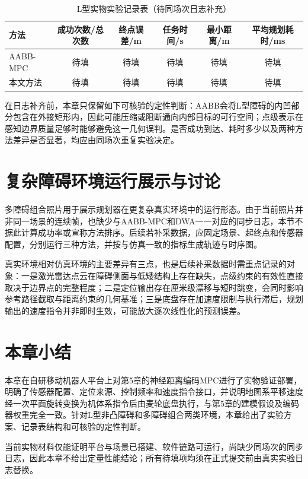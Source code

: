 \begin{table}[!htb]
	\centering
	\caption{L型实物实验记录表（待同场次日志补充）}
	\label{tab:实物L型结果}
	\scriptsize
	\begin{tabular}{lccccc}
		\toprule
		方法 & 成功次数/总次数 & 终点误差/m & 任务时间/s & 最小距离/m & 平均规划耗时/ms \\
		\midrule
		AABB-MPC & 待填 & 待填 & 待填 & 待填 & 待填 \\
		本文方法 & 待填 & 待填 & 待填 & 待填 & 待填 \\
		\bottomrule
	\end{tabular}
\end{table}

在日志补齐前，本章只保留如下可核验的定性判断：AABB会将L型障碍的内凹部分包含在外接矩形内，因此可能压缩或阻断通向内部目标的可行空间；点级表示在感知边界质量足够时能够避免这一几何误判。是否成功到达、耗时多少以及两种方法差异是否显著，均应由同场次重复实验决定。

\section{复杂障碍环境运行展示与讨论}
多障碍组合照片用于展示规划器在更复杂真实环境中的运行形态。由于当前照片并非同一场景的连续帧，也缺少与AABB-MPC和DWA一一对应的同步日志，本节不据此计算成功率或宣称方法排序。后续若补采数据，应固定场景、起终点和传感器配置，分别运行三种方法，并按与仿真一致的指标生成轨迹与时序图。

真实环境相对仿真环境的主要差异有三点，也是后续补采数据时需重点记录的对象：一是激光雷达点云在障碍侧面与低矮结构上存在缺失，点级约束的有效性直接取决于边界点的完整程度；二是定位输出存在厘米级漂移与短时跳变，会同时影响参考路径截取与距离约束的几何基准；三是底盘存在加速度限制与执行滞后，规划输出的速度指令并非即时生效，可能放大逐次线性化的预测误差。

\section{本章小结}
本章在自研移动机器人平台上对第5章的神经距离编码MPC进行了实物验证部署，明确了传感器配置、定位来源、控制频率和速度指令接口，并说明地图系平移速度经一次平面旋转变换为机体系指令后由麦轮底盘执行，与第5章的建模假设及编码器权重完全一致。针对L型非凸障碍和多障碍组合两类环境，本章给出了实验方案、记录表结构和可核验的定性判断。

当前实物材料仅能证明平台与场景已搭建、软件链路可运行，尚缺少同场次的同步日志，因此本章不给出定量性能结论；所有待填项均须在正式提交前由真实实验日志替换。
